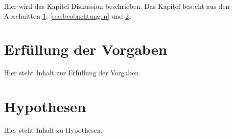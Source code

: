 Hier wird das Kapitel Diskussion beschrieben. Das Kapitel besteht aus den Abschnitten \ref{sec:erfuellung_der_vorgaben}, \ref{sec:beobachtungen} und \ref{sec:hypothesen}.


\section{Erfüllung der Vorgaben}
\label{sec:erfuellung_der_vorgaben}

Hier steht Inhalt zur Erfüllung der Vorgaben.


\section{Hypothesen}
\label{sec:hypothesen}

Hier steht Inhalt zu Hypothesen.